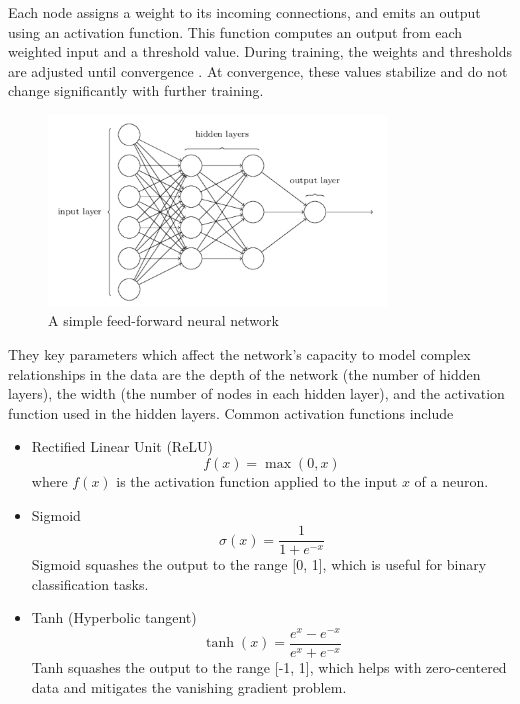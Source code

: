 Each node assigns a weight to its incoming connections, and emits an output using an activation function. This function computes an output from each weighted input and a threshold value. During training, the weights and thresholds are adjusted until convergence \cite{nnoverview}. At convergence, these values stabilize and do not change significantly with further training.

\begin{figure}[h]
	\centering
	\includegraphics[width=0.8\textwidth]{Figures/feedforward.png}
	\caption{A simple feed-forward neural network \cite{nn_fig}}
	\label{fig:feedforward}
\end{figure}

They key parameters which affect the network's capacity to model complex relationships in the data are the depth of the network (the number of hidden layers), the width (the number of nodes in each hidden layer), and the activation function used in the hidden layers. Common activation functions include 

\begin{itemize}
	\item Rectified Linear Unit (ReLU)
	\begin{equation}
		f(x) = \max(0, x)
	\end{equation}
	where \( f(x) \) is the activation function applied to the input \( x \) of a neuron.
	
	\item Sigmoid
	\begin{equation}
		\sigma(x) = \frac{1}{1 + e^{-x}}
	\end{equation}
	Sigmoid squashes the output to the range [0, 1], which is useful for binary classification tasks.
	
	\item Tanh (Hyperbolic tangent)
	\begin{equation}
		\tanh(x) = \frac{e^x - e^{-x}}{e^x + e^{-x}}
	\end{equation}
	Tanh squashes the output to the range [-1, 1], which helps with zero-centered data and mitigates the vanishing gradient problem.
\end{itemize}

